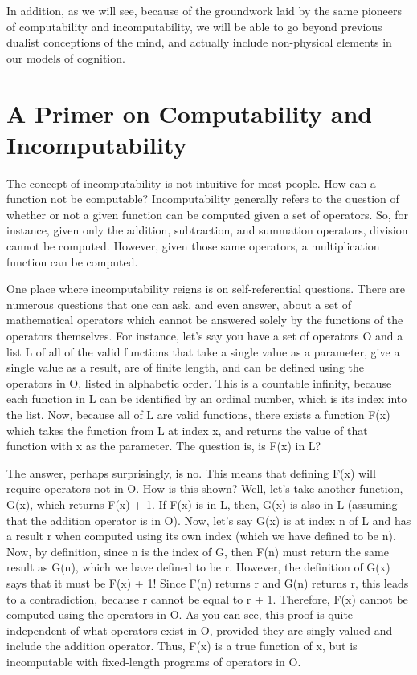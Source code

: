 In addition, as we will see, because of the groundwork laid by the same pioneers of computability and incomputability, we will be able to go beyond previous dualist conceptions of the mind, and actually include non-physical elements in our models of cognition.

\section{A Primer on Computability and Incomputability}

The concept of incomputability is not intuitive for most people.  How can a function not be computable?  Incomputability generally refers to the question of whether or not a given function can be computed given a set of operators.  So, for instance, given only the addition, subtraction, and summation operators, division cannot be computed.  However, given those same operators, a multiplication function can be computed.  

One place where incomputability reigns is on self-referential questions.  There are numerous questions that one can ask, and even answer, about a set of mathematical operators which cannot be answered solely by the functions of the operators themselves.  For instance, let's say you have a set of operators O and a list L of all of the valid functions that take a single value as a parameter, give a single value as a result, are of finite length, and can be defined using the operators in O, listed in alphabetic order.  This is a countable infinity, because each function in L can be identified by an ordinal number, which is its index into the list.  Now, because all of L are valid functions, there exists a function F(x) which takes the function from L at index x, and returns the value of that function with x as the parameter.  The question is, is F(x) in L?  

The answer, perhaps surprisingly, is no.  This means that defining F(x) will require operators not in O.  How is this shown?  Well, let's take another function, G(x), which returns F(x) + 1.  If F(x) is in L, then, G(x) is also in L (assuming that the addition operator is in O).  Now, let's say G(x) is at index n of L and has a result r when computed using its own index (which we have defined to be n).   Now, by definition, since n is the index of G, then F(n) must return the same result as G(n), which we have defined to be r.  However, the definition of G(x) says that it must be F(x) + 1!  Since F(n) returns r and G(n) returns r, this leads to a contradiction, because r cannot be equal to r + 1.  Therefore, F(x) cannot be computed using the operators in O. As you can see, this proof is quite independent of what operators exist in O, provided they are singly-valued and include the addition operator.  Thus, F(x) is a true function of x, but is incomputable with fixed-length programs of operators in O.

